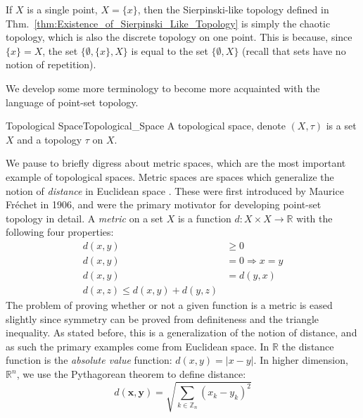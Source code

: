     If $X$ is a single point, $X=\{x\}$, then the Sierpinski-like topology
    defined in Thm.~\ref{thm:Existence_of_Sierpinski_Like_Topology} is simply
    the chaotic topology, which is also the discrete topology on one point.
    This is because, since $\{x\}=X$, the set $\{\emptyset,\{x\},X\}$ is equal
    to the set $\{\emptyset,X\}$ (recall that sets have no notion of
    repetition).
    \par\hfill\par
    We develop some more terminology to become more acquainted with the language
    of point-set topology.
    \begin{fdefinition}{Topological Space}{Topological_Space}
        A \gls{topological space}, denote $(X,\tau)$ is a \gls{set} $X$ and a
        \gls{topology} $\tau$ on $X$.
    \end{fdefinition}
    We pause to briefly digress about metric spaces, which are the most
    important example of topological spaces. Metric spaces are spaces which
    generalize the notion of \textit{distance} in Euclidean space%
    . These were first introduced by
    Maurice Fr\'{e}chet in 1906, and were the primary motivator for developing
    point-set topology in detail. A \textit{metric} on a set $X$
    is a function $d:X\times{X}\rightarrow\mathbb{R}$ with the following four
    properties:
    \begin{align}
        d(x,y)&\geq{0}
        \tag{Positivity}\\
        d(x,y)&=0\Longrightarrow{x=y}
        \tag{Definiteness}\\
        d(x,y)&=d(y,x)
        \tag{Symmetry}\\
        d(x,z)\leq{d}(x,y)+d(y,z)
        \tag{Triangle Inequality}
    \end{align}
    The problem of proving whether or not a given function is a metric is eased
    slightly since symmetry can be proved from definiteness and the triangle
    inequality. As stated before, this is a generalization of the notion of
    distance, and as such the primary examples come from Euclidean space. In
    $\mathbb{R}$ the distance function is the \textit{absolute value} function:
    $d(x,y)=|x-y|$. In higher dimension, $\mathbb{R}^{n}$, we use the
    Pythagorean theorem to define distance:
    \begin{equation}
        d(\mathbf{x},\mathbf{y})
        =\sqrt{\sum_{k\in\mathbb{Z}_{n}}(x_{k}-y_{k})^{2}}
    \end{equation}
